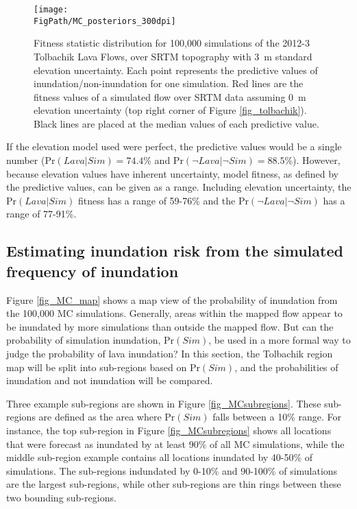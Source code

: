 		\begin{figure}[h!]
			\centering
			\texttt{[image: \\FigPath/MC\_posteriors\_300dpi]}
			\caption[Fitness statistic distribution of Monte Carlo simulations of the 2012-3 Tolbachik lava flows, over SRTM topography with 3~m standard elevation uncertainty]{Fitness statistic distribution for 100,000 simulations of the 2012-3 Tolbachik Lava Flows, over SRTM topography with 3~m standard elevation uncertainty. Each point represents the predictive values of inundation/non-inundation for one simulation. Red lines are the fitness values of a simulated flow over SRTM data assuming 0~m elevation uncertainty (top right corner of Figure \ref{fig_tolbachik}). Black lines are placed at the median values of each predictive value.}
			\label{fig:MC_dist}
		\end{figure}
			
			If the elevation model used were perfect, the predictive values would be a single number ($\text{Pr}(Lava|Sim)=74.4$\% and $\text{Pr}(\neg Lava|\neg Sim)=88.5$\%). However, because elevation values have inherent uncertainty, model fitness, as defined by the predictive values, can be given as a range. Including elevation uncertainty, the $\text{Pr}(Lava|Sim)$ fitness has a range of 59-76\% and the $\text{Pr}(\neg Lava|\neg Sim)$ has a range of 77-91\%.


		\subsection{Estimating inundation risk from the simulated frequency of inundation}
		Figure \ref{fig_MC_map} shows a map view of the probability of inundation from the 100,000 MC simulations. Generally, areas within the mapped flow appear to be inundated by more simulations than outside the mapped flow. But can the probability of simulation inundation, $\text{Pr}(Sim)$, be used in a more formal way to judge the probability of lava inundation? In this section, the Tolbachik region map will be split into sub-regions based on $\text{Pr}(Sim)$, and the probabilities of inundation and not inundation will be compared.
		
		Three example sub-regions are shown in Figure \ref{fig_MCsubregions}. These sub-regions are defined as the area where $\text{Pr}(Sim)$ falls between a 10\% range. For instance, the top sub-region in Figure \ref{fig_MCsubregions} shows all locations that were forecast as inundated by at least 90\% of all MC simulations, while the middle sub-region example contains all locations inundated by 40-50\% of simulations. The sub-regions indundated by 0-10\% and 90-100\% of simulations are the largest sub-regions, while other sub-regions are thin rings between these two bounding sub-regions.
		
